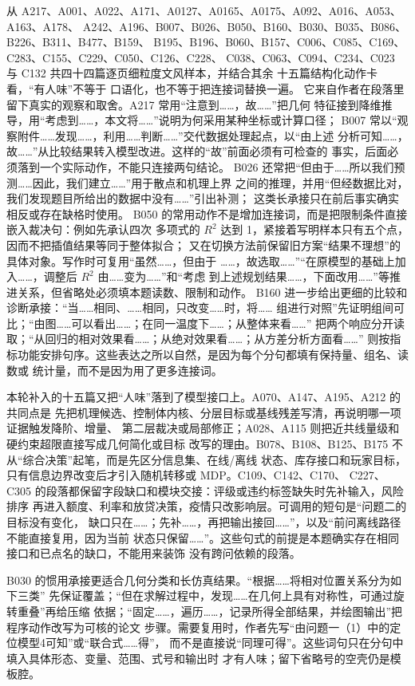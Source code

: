 \documentclass[UTF8,a4paper,12pt]{ctexart}
\begin{document}
从 A217、A001、A022、A171、A0127、A0165、A0175、A092、A016、A053、A163、A178、
A242、A196、B007、B026、B050、B160、B030、B035、B086、B226、B311、B477、B159、
B195、B196、B060、B157、C006、C085、C169、C283、C155、C229、C050、C126、C228、
C038、C063、C094、C234、C023 与 C132 共四十四篇逐页细粒度文风样本，并结合其余
十五篇结构化动作卡看，“有人味”不等于
口语化，也不等于把连接词替换一遍。
它来自作者在段落里留下真实的观察和取舍。A217 常用“注意到……，故……”把几何
特征接到降维推导，用“考虑到……，本文将……”说明为何采用某种坐标或计算口径；
B007 常以“观察附件……发现……，利用……判断……”交代数据处理起点，以“由上述
分析可知……，故……”从比较结果转入模型改进。这样的“故”前面必须有可检查的
事实，后面必须落到一个实际动作，不能只连接两句结论。
B026 还常把“但由于……所以我们预测……因此，我们建立……”用于散点和机理上界
之间的推理，并用“但经数据比对，我们发现题目所给出的数据中没有……”引出补测；
这类长承接只在前后事实确实相反或存在缺格时使用。
B050 的常用动作不是增加连接词，而是把限制条件直接嵌入裁决句：例如先承认四次
多项式的 $R^2$ 达到 1，紧接着写明样本只有五个点，因而不把插值结果等同于整体拟合；
又在切换方法前保留旧方案“结果不理想”的具体对象。写作时可复用“虽然……，但由于
……，故选取……”“在原模型的基础上加入……，调整后 $R^2$ 由……变为……”和“考虑
到上述规划结果……，下面改用……”等推进关系，但省略处必须填本题读数、限制和动作。
B160 进一步给出更细的比较和诊断承接：“当……相同、……相同，只改变……时，将……
组进行对照”先证明组间可比；“由图……可以看出……；在同一温度下……；从整体来看……”
把两个响应分开读取；“从回归的相对效果看……；从绝对效果看……；从方差分析方面看……”
则按指标功能安排句序。这些表达之所以自然，是因为每个分句都填有保持量、组名、读数或
统计量，而不是因为用了更多连接词。

本轮补入的十五篇又把“人味”落到了模型接口上。A070、A147、A195、A212 的共同点是
先把机理候选、控制体内核、分层目标或基线残差写清，再说明哪一项证据触发降阶、增量、
第二层裁决或局部修正；A028、A115 则把近共线量级和硬约束超限直接写成几何简化或目标
改写的理由。B078、B108、B125、B175 不从“综合决策”起笔，而是先区分信息集、在线/离线
状态、库存接口和玩家目标，只有信息边界改变后才引入随机转移或 MDP。C109、C142、C170、
C227、C305 的段落都保留字段缺口和模块交接：评级或违约标签缺失时先补输入，风险排序
再进入额度、利率和放贷决策，疫情只改影响层。可调用的短句是“问题二的目标没有变化，
缺口只在……；先补……，再把输出接回……”，以及“前问离线路径不能直接复用，因为当前
状态只保留……”。这些句式的前提是本题确实存在相同接口和已点名的缺口，不能用来装饰
没有跨问依赖的段落。

B030 的惯用承接更适合几何分类和长仿真结果。“根据……将相对位置关系分为如下三类”
先保证覆盖；“但在求解过程中，发现……在几何上具有对称性，可通过旋转重叠”再给压缩
依据；“固定……，遍历……，记录所得全部结果，并绘图输出”把程序动作改写为可核的论文
步骤。需要复用时，作者先写“由问题一（1）中的定位模型4可知”或“联合式……得”，
而不是直接说“同理可得”。这些词句只在分句中填入具体形态、变量、范围、式号和输出时
才有人味；留下省略号的空壳仍是模板腔。
\end{document}
